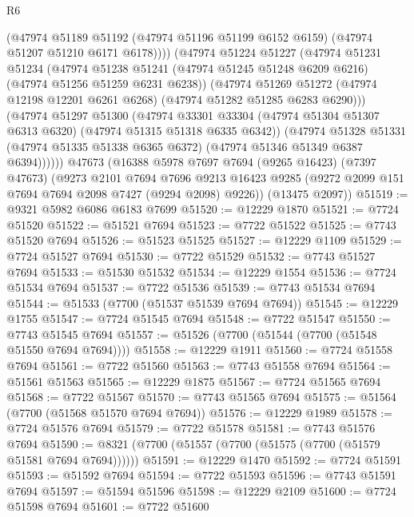 \begin{lexlean}{R6}
\begin{coremodule}
            (@47974
              @51189
              @51192
              (@47974 @51196 @51199 @6152 @6159)
              (@47974 @51207 @51210 @6171 @6178))))
        (@47974
          @51224
          @51227
          (@47974
            @51231
            @51234
            (@47974
              @51238
              @51241
              (@47974 @51245 @51248 @6209 @6216)
              (@47974 @51256 @51259 @6231 @6238))
            (@47974
              @51269
              @51272
              (@47974 @12198 @12201 @6261 @6268)
              (@47974 @51282 @51285 @6283 @6290)))
          (@47974
            @51297
            @51300
            (@47974
              @33301
              @33304
              (@47974 @51304 @51307 @6313 @6320)
              (@47974 @51315 @51318 @6335 @6342))
            (@47974
              @51328
              @51331
              (@47974 @51335 @51338 @6365 @6372)
              (@47974 @51346 @51349 @6387 @6394))))))
    @47673
    (@16388
      @5978
      @7697
      @7694
      (@9265 @16423)
      (@7397 @47673)
      (@9273
        @2101
        @7694
        @7696
        @9213
        @16423
        @9285
        (@9272 @2099 @151 @7694 @7694 @2098 @7427 (@9294 @2098) @9226))
      (@13475 @2097))
@51519 := @9321 @5982 @6086 @6183 @7699
@51520 := @12229 @1870
@51521 := @7724 @51520
@51522 := @51521 @7694
@51523 := @7722 @51522
@51525 := @7743 @51520 @7694
@51526 := @51523 @51525
@51527 := @12229 @1109
@51529 := @7724 @51527 @7694
@51530 := @7722 @51529
@51532 := @7743 @51527 @7694
@51533 := @51530 @51532
@51534 := @12229 @1554
@51536 := @7724 @51534 @7694
@51537 := @7722 @51536
@51539 := @7743 @51534 @7694
@51544 := @51533 (@7700 (@51537 @51539 @7694 @7694))
@51545 := @12229 @1755
@51547 := @7724 @51545 @7694
@51548 := @7722 @51547
@51550 := @7743 @51545 @7694
@51557 := @51526 (@7700 (@51544 (@7700 (@51548 @51550 @7694 @7694))))
@51558 := @12229 @1911
@51560 := @7724 @51558 @7694
@51561 := @7722 @51560
@51563 := @7743 @51558 @7694
@51564 := @51561 @51563
@51565 := @12229 @1875
@51567 := @7724 @51565 @7694
@51568 := @7722 @51567
@51570 := @7743 @51565 @7694
@51575 := @51564 (@7700 (@51568 @51570 @7694 @7694))
@51576 := @12229 @1989
@51578 := @7724 @51576 @7694
@51579 := @7722 @51578
@51581 := @7743 @51576 @7694
@51590 := @8321 (@7700 (@51557 (@7700 (@51575 (@7700 (@51579 @51581 @7694 @7694))))))
@51591 := @12229 @1470
@51592 := @7724 @51591
@51593 := @51592 @7694
@51594 := @7722 @51593
@51596 := @7743 @51591 @7694
@51597 := @51594 @51596
@51598 := @12229 @2109
@51600 := @7724 @51598 @7694
@51601 := @7722 @51600

\end{coremodule}
\end{lexlean}
